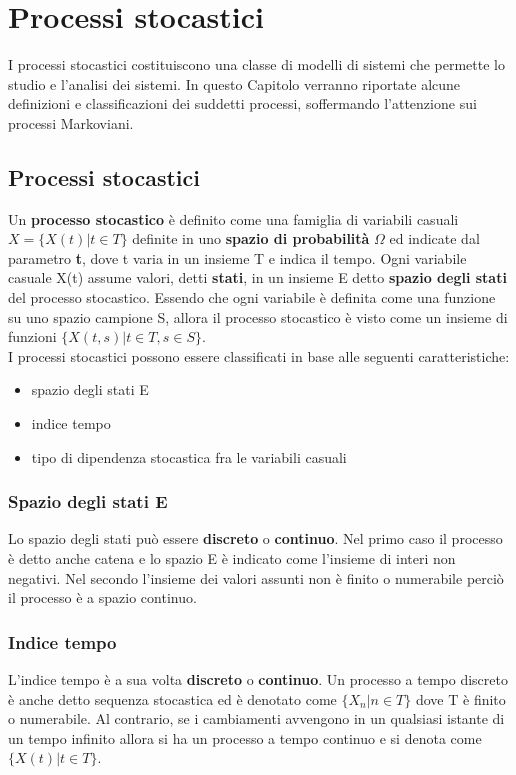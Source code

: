 \chapter{Processi stocastici}
I processi stocastici costituiscono una classe di modelli di sistemi che permette lo
studio e l’analisi dei sistemi. In questo Capitolo verranno riportate alcune definizioni e classificazioni dei suddetti processi, soffermando l'attenzione sui processi Markoviani.

\section{Processi stocastici}
Un \textbf{processo stocastico} è definito come una famiglia di variabili casuali $X = \{X(t) | t \in T\}$ definite in uno \textbf{spazio di probabilità} $\Omega$ ed indicate dal parametro \textbf{t}, dove t varia in un insieme T e indica il tempo. Ogni variabile casuale X(t) assume valori, detti \textbf{stati}, in un insieme E detto \textbf{spazio degli stati} del processo stocastico. Essendo che ogni variabile è definita come una funzione su uno spazio campione S, allora il processo stocastico è visto come un insieme di funzioni $\{ X(t,s) | t\in T, s \in S\}$.\\
I processi stocastici possono essere classificati in base alle seguenti caratteristiche:
\begin{itemize}
    \item spazio degli stati E
    \item indice tempo
    \item tipo di dipendenza stocastica fra le variabili casuali
\end{itemize}

\subsection{Spazio degli stati E}
Lo spazio degli stati può essere \textbf{discreto} o \textbf{continuo}. Nel primo caso il processo è detto anche catena e lo spazio E è indicato come l'insieme di interi non negativi. Nel secondo l'insieme dei valori assunti non è finito o numerabile perciò il processo è a spazio continuo.
\subsection{Indice tempo}
L'indice tempo è a sua volta \textbf{discreto} o \textbf{continuo}. Un processo a tempo discreto è anche detto sequenza stocastica ed è denotato come $\{X_n | n \in T \}$ dove T è finito o numerabile. Al contrario, se i cambiamenti avvengono in un qualsiasi istante di un tempo infinito allora si ha un processo a tempo continuo e si denota come $\{ X(t) | t\in T\}$.

